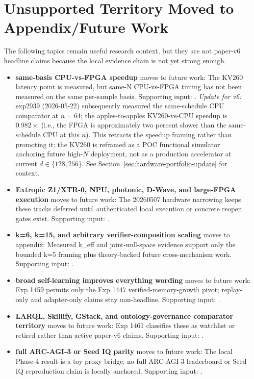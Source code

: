 \documentclass[10pt]{article}
\begin{document}



\appendix

\section{Unsupported Territory Moved to Appendix/Future Work}
\label{app:unsupported-future-work}

The following topics remain useful research context, but they are not paper-v6 headline claims because the local evidence chain is not yet strong enough.

\begin{itemize}
  \item \textbf{same-basis CPU-vs-FPGA speedup} moves to future work: The KV260 latency point is measured, but same-N CPU-vs-FPGA timing has not been measured on the same per-sample basis.
  Supporting input: .
  \emph{Update for v6:} exp2939 (2026-05-22) subsequently measured the same-schedule CPU comparator at $n=64$; the apples-to-apples KV260-vs-CPU speedup is $0.982\times$ (i.e., the FPGA is approximately two percent slower than the same-schedule CPU at this $n$). This retracts the speedup framing rather than promoting it; the KV260 is reframed as a POC functional simulator anchoring future high-$N$ deployment, not as a production accelerator at current $d \in \{128, 256\}$. See Section~\ref{sec:hardware-portfolio-update} for context.
  \item \textbf{Extropic Z1/XTR-0, NPU, photonic, D-Wave, and large-FPGA execution} moves to future work: The 20260507 hardware narrowing keeps these tracks deferred until authenticated local execution or concrete reopen gates exist.
  Supporting input: .
  \item \textbf{k=6, k=15, and arbitrary verifier-composition scaling} moves to appendix: Measured k\_eff and joint-null-space evidence support only the bounded k=5 framing plus theory-backed future cross-mechanism work.
  Supporting input: .
  \item \textbf{broad self-learning improves everything wording} moves to future work: Exp 1459 permits only the Exp 1447 verified-memory-growth pivot; replay-only and adapter-only claims stay non-headline.
  Supporting input: .
  \item \textbf{LARQL, Skillify, GStack, and ontology-governance comparator territory} moves to future work: Exp 1461 classifies these as watchlist or retired rather than active paper-v6 claims.
  Supporting input: .
  \item \textbf{full ARC-AGI-3 or Seed IQ parity} moves to future work: The local Phase-4 result is a toy proxy bridge; no full ARC-AGI-3 leaderboard or Seed IQ reproduction claim is locally anchored.
  Supporting input: .
\end{itemize}
\end{document}
